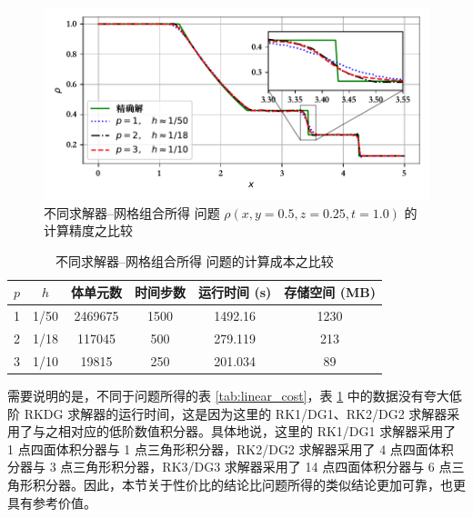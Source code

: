 \begin{figure}[h!]
\begin{centering}
\includegraphics[width=1\textwidth,height=0.3\textheight]{figures/shock_tubes/sod/h_vary_tetra}
\par\end{centering}
\caption{\label{fig:sod_error}不同求解器–网格组合所得 问题
$\rho(x,y=0.5,z=0.25,t=1.0)$ 的计算精度之比较}
\end{figure}

\begin{table}
\caption{\label{tab:sod_cost}不同求解器–网格组合所得 问题的计算成本之比较}

\centering{}%
\begin{tabular}{cccccc}
\toprule 
$p$ & $h$ & 体单元数 & 时间步数 & 运行时间 (s) & 存储空间 (MB)\tabularnewline
\midrule 
1 & 1/50 & 2469675 & 1500 & 1492.16 & 1230\tabularnewline
2 & 1/18 & 117045 & 500 & 279.119 & 213\tabularnewline
3 & 1/10 & 19815 & 250 & 201.034 & 89\tabularnewline
\bottomrule
\end{tabular}
\end{table}

需要说明的是，不同于问题所得的表
\ref{tab:linear_cost}，表 \ref{tab:sod_cost} 中的数据没有夸大低阶 RKDG 求解器的运行时间，这是因为这里的
RK1/DG1、RK2/DG2 求解器采用了与之相对应的低阶数值积分器。具体地说，这里的 RK1/DG1 求解器采用了 1 点四面体积分器与
1 点三角形积分器，RK2/DG2 求解器采用了 4 点四面体积分器与 3 点三角形积分器，RK3/DG3 求解器采用了 14 点四面体积分器与
6 点三角形积分器。因此，本节关于性价比的结论比问题所得的类似结论更加可靠，也更具有参考价值。

